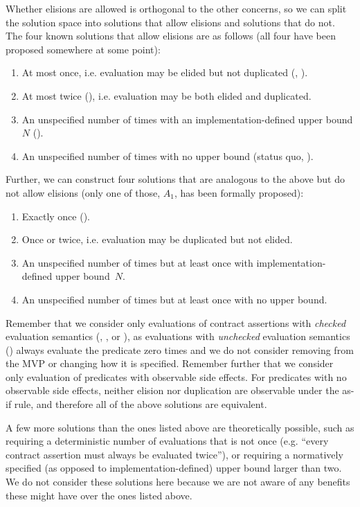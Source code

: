 Whether elisions are allowed is orthogonal to the other concerns, so we can split the solution space into solutions that allow elisions and solutions that do not. The four known solutions that allow elisions are as follows (all four have been proposed somewhere at some point):

\renewcommand{\theenumi}{$\Alph{enumi}_0$} \begin{enumerate}
\item At most once, i.e. evaluation may be elided but not duplicated (\cite{P1670R0}, \cite{D3197R0}).
\item At most twice (\cite{P2521R5}), i.e. evaluation may be both elided and duplicated.
\item An unspecified number of times with an implementation-defined upper bound $N$ (\cite{P3119R0}).
\item An unspecified number of times with no upper bound (status quo, \cite{P2900R6}).
\end{enumerate}
Further, we can construct four solutions that are analogous to the above but do not allow elisions (only one of those, $A_1$, has been formally proposed):
\renewcommand{\theenumi}{$\Alph{enumi}_1$} \begin{enumerate}
\item Exactly once (\cite{P2756R0}).
\item Once or twice, i.e. evaluation may be duplicated but not elided.
\item An unspecified number of times but at least once with implementation-defined upper \mbox{bound $N$}.
\item An unspecified number of times but at least once with no upper bound.
\end{enumerate}

 Remember that we consider only evaluations of contract assertions with \emph{checked} evaluation semantics (, , or ), as evaluations with \emph{unchecked} evaluation semantics () always evaluate the predicate zero times and we do not consider removing  from the MVP or changing how it is specified. Remember further that we consider only evaluation of predicates with observable side effects. For predicates with no observable side effects, neither elision nor duplication are observable under the as-if rule, and therefore all of the above solutions are equivalent. 

A few more solutions than the ones listed above are theoretically possible, such as requiring a deterministic number of evaluations that is not once (e.g. ``every contract assertion must always be evaluated twice''), or requiring a normatively specified (as opposed to implementation-defined) upper bound larger than two. We do not consider these solutions here because we are not aware of any benefits these might have over the ones listed above. 

